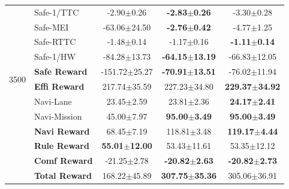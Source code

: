 {\begin{longtable}{l l c c c}
  \multirow{10}{*}{3500}
  & Safe-1/TTC       & -2.90$\pm$0.26 & \textbf{-2.83$\pm$0.26} & -3.30$\pm$0.28 \\
  & Safe-MEI         & -63.06$\pm$24.50 & \textbf{-2.76$\pm$0.42} & -4.77$\pm$1.25 \\
  & Safe-RTTC        & -1.48$\pm$0.14 & -1.17$\pm$0.16 & \textbf{-1.11$\pm$0.14} \\
  & Safe-1/HW        & -84.28$\pm$13.73 & \textbf{-64.15$\pm$13.19} & -66.83$\pm$12.05 \\
  & \textbf{Safe Reward} & -151.72$\pm$25.27 & \textbf{-70.91$\pm$13.51} & -76.02$\pm$11.94 \\
  & \textbf{Effi Reward} & 217.74$\pm$35.59 & 227.23$\pm$34.80 & \textbf{229.37$\pm$34.92} \\
  & Navi-Lane        & 23.45$\pm$2.59 & 23.81$\pm$2.36 & \textbf{24.17$\pm$2.41} \\
  & Navi-Mission     & 45.00$\pm$7.97 & \textbf{95.00$\pm$3.49} & \textbf{95.00$\pm$3.49} \\
  & \textbf{Navi Reward} & 68.45$\pm$7.19 & 118.81$\pm$3.48 & \textbf{119.17$\pm$4.44} \\
  & \textbf{Rule Reward} & \textbf{55.01$\pm$12.00} & 53.43$\pm$11.61 & 53.35$\pm$12.12 \\
  & \textbf{Comf Reward} & -21.25$\pm$2.78 & \textbf{-20.82$\pm$2.63} & \textbf{-20.82$\pm$2.73} \\
  & \textbf{Total Reward} & 168.22$\pm$45.89 & \textbf{307.75$\pm$35.36} & 305.06$\pm$36.91 \\
  \midrule


\end{longtable}}
